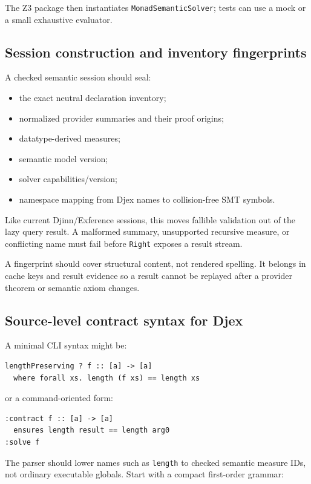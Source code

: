 \documentclass[11pt,oneside]{article}
\newcommand{\code}[1]{\texttt{#1}}
\begin{document}
The Z3 package then instantiates \code{MonadSemanticSolver}; tests can use a mock or a
small exhaustive evaluator.

\subsection{Session construction and inventory fingerprints}

A checked semantic session should seal:

\begin{itemize}
  \item the exact neutral declaration inventory;
  \item normalized provider summaries and their proof origins;
  \item datatype-derived measures;
  \item semantic model version;
  \item solver capabilities/version;
  \item namespace mapping from Djex names to collision-free SMT symbols.
\end{itemize}

Like current Djinn/Exference sessions, this moves fallible validation out of the lazy
query result. A malformed summary, unsupported recursive measure, or conflicting name
must fail before \code{Right} exposes a result stream.

A fingerprint should cover structural content, not rendered spelling. It belongs in
cache keys and result evidence so a result cannot be replayed after a provider theorem
or semantic axiom changes.

\subsection{Source-level contract syntax for Djex}

A minimal CLI syntax might be:

\begin{lstlisting}[language=HaskellExt]
lengthPreserving ? f :: [a] -> [a]
  where forall xs. length (f xs) == length xs
\end{lstlisting}

or a command-oriented form:

\begin{lstlisting}[language=HaskellExt]
:contract f :: [a] -> [a]
  ensures length result == length arg0
:solve f
\end{lstlisting}

The parser should lower names such as \code{length} to checked semantic measure IDs,
not ordinary executable globals. Start with a compact first-order grammar:
\end{document}
